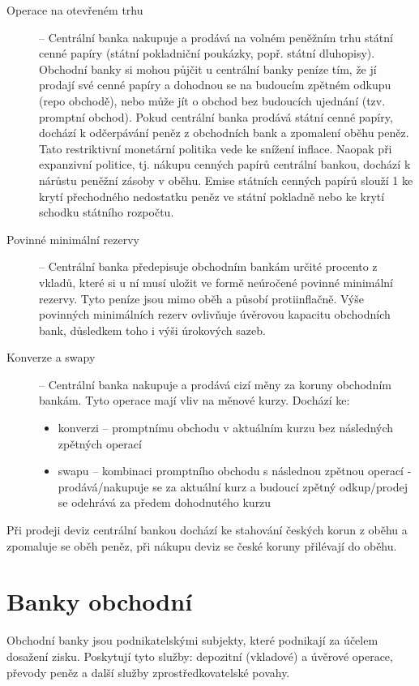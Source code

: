\begin{description}
    \item[Operace na otevřeném trhu] -- Centrální banka nakupuje a prodává na volném peněžním trhu státní cenné papíry (státní pokladniční poukázky, popř. státní dluhopisy). Obchodní banky si mohou půjčit u centrální banky peníze tím, že jí prodají své cenné papíry a dohodnou se na budoucím zpětném odkupu (repo obchodě), nebo může jít o obchod bez budoucích ujednání (tzv. promptní obchod). Pokud centrální banka prodává státní cenné papíry, dochází k odčerpávání peněz z obchodních bank a zpomalení oběhu peněz. Tato restriktivní monetární politika vede ke snížení inflace. Naopak při expanzivní politice, tj. nákupu cenných papírů centrální bankou, dochází k nárůstu peněžní zásoby v oběhu. Emise státních cenných papírů slouží 1 ke krytí přechodného nedostatku peněz ve státní pokladně nebo ke krytí schodku státního rozpočtu.
    \item[Povinné minimální rezervy] -- Centrální banka předepisuje obchodním bankám určité procento z vkladů, které si u ní musí uložit ve formě neúročené povinné minimální rezervy. Tyto peníze jsou mimo oběh a působí protiinflačně. Výše povinných minimálních rezerv ovlivňuje úvěrovou kapacitu obchodních bank, důsledkem toho i výši úrokových sazeb.
    \item[Konverze a swapy] -- Centrální banka nakupuje a prodává cizí měny za koruny obchodním bankám. Tyto operace mají vliv na měnové kurzy. Dochází ke:
        \begin{itemize}
            \item konverzi -- promptnímu obchodu v aktuálním kurzu bez následných zpětných operací
            \item swapu -- kombinaci promptního obchodu s následnou zpětnou operací - prodává/nakupuje se za aktuální kurz a budoucí zpětný odkup/prodej se odehrává za předem dohodnutého kurzu
        \end{itemize}
\end{description}        

Při prodeji deviz centrální bankou dochází ke stahování českých korun z oběhu a zpomaluje se oběh peněz, při nákupu deviz se české koruny přilévají do oběhu.

\section*{Banky obchodní}

Obchodní banky jsou podnikatelskými subjekty, které podnikají za účelem dosažení zisku. Poskytují tyto služby: depozitní (vkladové) a úvěrové operace, převody peněz a další služby zprostředkovatelské povahy.

